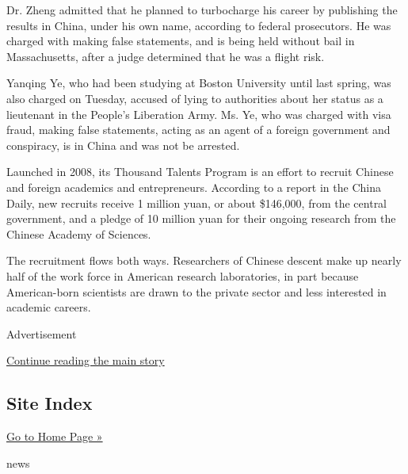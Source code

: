 Dr. Zheng admitted that he planned to turbocharge his career by
publishing the results in China, under his own name, according to
federal prosecutors. He was charged with making false statements, and is
being held without bail in Massachusetts, after a judge determined that
he was a flight risk.

Yanqing Ye, who had been studying at Boston University until last
spring, was also charged on Tuesday, accused of lying to authorities
about her status as a lieutenant in the People's Liberation Army. Ms.
Ye, who was charged with visa fraud, making false statements, acting as
an agent of a foreign government and conspiracy, is in China and was not
be arrested.

Launched in 2008, its Thousand Talents Program is an effort to recruit
Chinese and foreign academics and entrepreneurs. According to a report
in the China Daily, new recruits receive 1 million yuan, or about
\$146,000, from the central government, and a pledge of 10 million yuan
for their ongoing research from the Chinese Academy of Sciences.

The recruitment flows both ways. Researchers of Chinese descent make up
nearly half of the work force in American research laboratories, in part
because American-born scientists are drawn to the private sector and
less interested in academic careers.

Advertisement

\protect\hyperlink{after-bottom}{Continue reading the main story}

\hypertarget{site-index}{%
\subsection{Site Index}\label{site-index}}

\href{/web/20200128165017/https://www.nytimes.com/}{Go to Home Page »}

news

